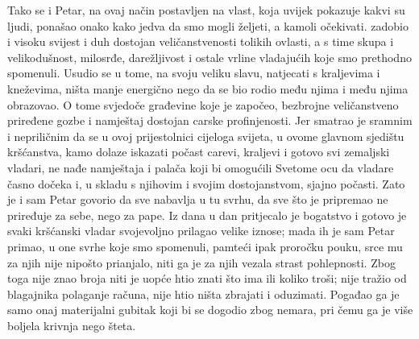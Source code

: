 \documentclass[a5paper,twoside]{article}
\begin{document}
\pend
\pstart
Tako se i Petar, na ovaj način postavljen na vlast, koja uvijek pokazuje kakvi su ljudi, ponašao onako kako jedva da smo mogli željeti, a kamoli očekivati.   zadobio i visoku svijest i duh dostojan veličanstvenosti tolikih ovlasti, a s time skupa i velikodušnost, milosrđe, darežljivost i ostale vrline vladajućih koje smo prethodno spomenuli.  Usudio se u tome, na svoju veliku slavu, natjecati s kraljevima i kneževima, ništa manje energično nego da se bio rodio među njima i među njima obrazovao. O tome svjedoče građevine koje je započeo, bezbrojne veličanstveno priređene gozbe i namještaj dostojan carske profinjenosti.  Jer smatrao je sramnim i nepriličnim da se u ovoj prijestolnici cijeloga svijeta, u ovome glavnom sjedištu kršćanstva, kamo dolaze iskazati počast carevi, kraljevi i gotovo svi zemaljski vladari, ne nađe namještaja i palača koji bi omogućili Svetome ocu da vladare časno dočeka i, u skladu s njihovim i svojim dostojanstvom, sjajno počasti.  Zato je i sam Petar govorio da sve nabavlja u tu svrhu, da sve što je pripremao ne priređuje za sebe, nego za pape.  Iz dana u dan pritjecalo je bogatstvo i gotovo je svaki kršćanski vladar svojevoljno prilagao velike iznose; mada ih je sam Petar primao, u one svrhe koje smo spomenuli, pamteći ipak proročku pouku, srce mu za njih nije nipošto prianjalo, niti ga je za njih vezala strast pohlepnosti.  Zbog toga nije znao broja niti je uopće htio znati što ima ili koliko troši; nije tražio od blagajnika polaganje računa, nije htio ništa zbrajati i oduzimati.  Pogađao ga je samo onaj materijalni gubitak koji bi se dogodio zbog nemara, pri čemu ga je više boljela krivnja nego šteta.  
\end{document}
